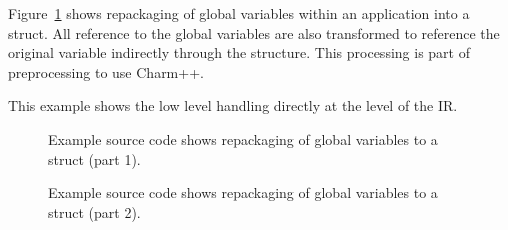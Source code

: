    Figure~\ref{Tutorial:exampleGlobalVariableHandling} shows repackaging of global
variables within an application into a struct. All reference to the global variables
are also transformed to reference the original variable indirectly through the structure.
This processing is part of preprocessing to use Charm++.  

   This example shows the low level handling directly at the level of the IR.

\begin{figure}[!h]
{\indent
{\mySmallestFontSize


\begin{latexonly}
%  
   
\end{latexonly}

\begin{htmlonly}
   
\end{htmlonly}

}
}
\caption{Example source code shows repackaging of global variables to a struct (part 1).}
\label{Tutorial:exampleGlobalVariableHandling}
\end{figure}

\begin{figure}[!h]
{\indent
{\mySmallestFontSize


\begin{latexonly}
   
\end{latexonly}

\begin{htmlonly}
%   
\end{htmlonly}

}
}
\caption{Example source code shows repackaging of global variables to a struct (part 2).}
\label{Tutorial:exampleGlobalVariableHandling2}
\end{figure}

